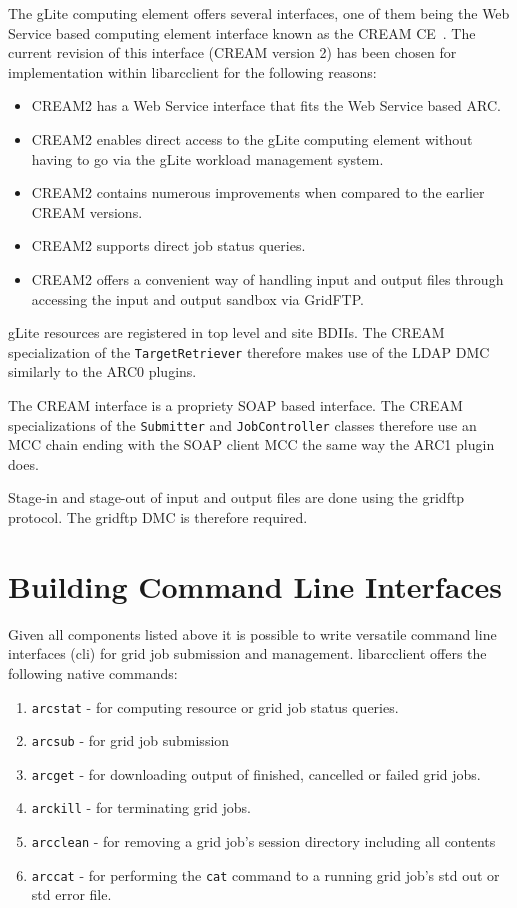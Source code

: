 \documentclass{book}
\newcommand{\arclib}{libarcclient}
\newcommand{\JobController}{\texttt{JobController}}
\newcommand{\TargetRetriever}{\texttt{TargetRetriever}}
\newcommand{\Submitter}{\texttt{Submitter}}
\begin{document}
The gLite computing element offers several interfaces, one of them
being the Web Service based computing element interface known as the
CREAM CE~\cite{cream}. The current revision of this interface (CREAM
version 2) has been chosen for implementation within {\arclib} for the
following reasons:

\begin{itemize}
\item CREAM2 has a Web Service interface that fits the Web Service
  based ARC.
\item CREAM2 enables direct access to the gLite computing element
  without having to go via the gLite workload management system.
\item CREAM2 contains numerous improvements when compared to the
  earlier CREAM versions.
\item CREAM2 supports direct job status queries.
\item CREAM2 offers a convenient way of handling input and output
  files through accessing the input and output sandbox via GridFTP.
\end{itemize}

gLite resources are registered in top level and site BDIIs. The CREAM
specialization of the {\TargetRetriever} therefore makes use of the
LDAP DMC similarly to the ARC0 plugins.

The CREAM interface is a propriety SOAP based interface. The CREAM
specializations of the {\Submitter} and {\JobController} classes
therefore use an MCC chain ending with the SOAP client MCC the same 
way the ARC1 plugin does.

Stage-in and stage-out of input and output files are done using the
gridftp protocol. The gridftp DMC is therefore required.

\chapter{Building Command Line Interfaces}
\label{sec:cli}

Given all components listed above it is possible to write versatile
command line interfaces (cli) for grid job submission and
management. {\arclib} offers the following native commands:

\begin{enumerate}
\item{\texttt{arcstat} - for computing resource or grid job status
  queries.}
\item{\texttt{arcsub} - for grid job submission}
\item{\texttt{arcget} - for downloading output of finished, cancelled
  or failed grid jobs.}
\item{\texttt{arckill} - for terminating grid jobs.}
\item{\texttt{arcclean} - for removing a grid job's session directory
  including all contents}
\item{\texttt{arccat} - for performing the \texttt{cat} command to a
  running grid job's std out or std error file.}
\end{enumerate}
\end{document}
